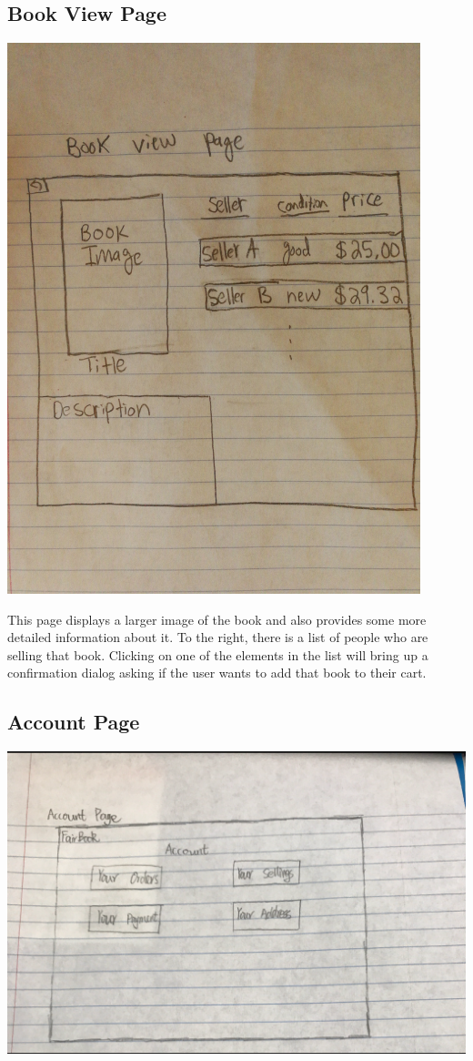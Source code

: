 \documentclass[12pt]{article}
\begin{document}
		\subsection{Book View Page}
		\includegraphics[width=12cm]{book_view_page.eps}
			\par
			This page displays a larger image of the book and also provides some more detailed information about it. 
			To the right, there is a list of people who are selling that book. 
			Clicking on one of the elements in the list will bring up a confirmation dialog asking if the user wants to add that book to their cart.

		\subsection{Account Page}
		\includegraphics[width=14cm]{account_page.eps}
\end{document}
